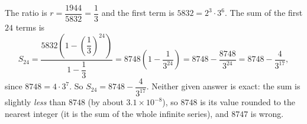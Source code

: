 The ratio is $r=\dfrac{1944}{5832}=\dfrac{1}{3}$ and the first term is $5832=2^3\cdot3^6$. The sum of the first $24$ terms is
\[
S_{24}=\dfrac{5832\left(1-\left(\dfrac{1}{3}\right)^{24}\right)}{1-\dfrac{1}{3}}=8748\left(1-\dfrac{1}{3^{24}}\right)=8748-\dfrac{8748}{3^{24}}=8748-\dfrac{4}{3^{17}},
\]
since $8748=4\cdot3^7$. So $S_{24}=\boxed{8748-\dfrac{4}{3^{17}}}$. Neither given answer is exact: the sum is slightly \emph{less} than $8748$ (by about $3.1\times10^{-8}$), so $8748$ is its value rounded to the nearest integer (it is the sum of the whole infinite series), and $8747$ is wrong.
